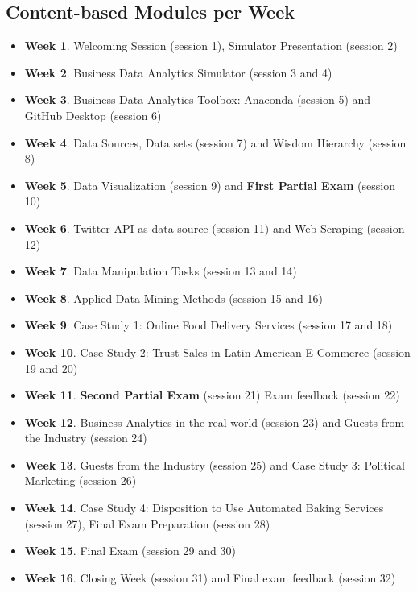 \documentclass[letterpaper,11pt]{article}
\begin{document}
\subsection{Content-based Modules per Week}
\begin{itemize}
\item \textbf{Week 1}. Welcoming Session (session 1), Simulator Presentation (session 2)
\item \textbf{Week 2}. Business Data Analytics Simulator (session 3 and 4)
\item \textbf{Week 3}. Business Data Analytics Toolbox: Anaconda (session 5) and GitHub Desktop (session 6)
\item \textbf{Week 4}. Data Sources, Data sets (session 7) and Wisdom Hierarchy  (session 8)
\item \textbf{Week 5}. Data Visualization (session 9) and \textbf{First Partial Exam} (session 10)
\item \textbf{Week 6}. Twitter API as data source (session 11) and Web Scraping (session 12)
\item \textbf{Week 7}. Data Manipulation Tasks (session 13 and 14)
\item \textbf{Week 8}. Applied Data Mining Methods (session 15 and 16)
\item \textbf{Week 9}. Case Study 1: Online Food Delivery Services (session 17 and 18)
\item \textbf{Week 10}. Case Study 2: Trust-Sales in Latin American E-Commerce (session 19 and 20)
\item \textbf{Week 11}. \textbf{Second Partial Exam} (session 21) Exam feedback (session 22)
\item \textbf{Week 12}. Business Analytics in the real world (session 23) and Guests from the Industry (session 24)
\item \textbf{Week 13}. Guests from the Industry (session 25) and Case Study 3: Political Marketing (session 26)
\item \textbf{Week 14}. Case Study 4: Disposition to Use Automated Baking Services (session 27), Final Exam Preparation (session 28)
\item \textbf{Week 15}. Final Exam (session 29 and 30)
\item \textbf{Week 16}. Closing Week (session 31) and Final exam feedback (session 32)
\end{itemize}
\end{document}
